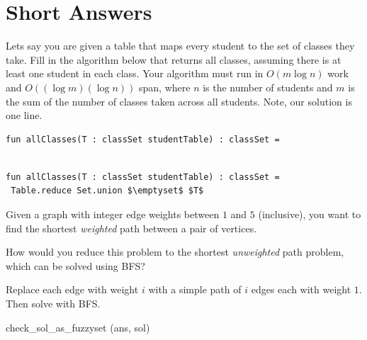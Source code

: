 \section{Short Answers}

%

\begin{problem}[20.][Classes]

Lets say you are given a table that maps every student to the set of
classes they take.  
Fill in the algorithm below that returns all classes,
assuming there is at least one student in each class.  Your algorithm
must run in $O(m \log n)$ work and $O((\log m)(\log n))$ span, where
$n$ is the number of students and $m$ is the sum of the number of
classes taken across all students.    Note, our solution is one line.

\ask

\begin{lstlisting}[numbers=none]
fun allClasses(T : classSet studentTable) : classSet = 


\end{lstlisting}


\sol
\begin{lstlisting}[numbers=none]
fun allClasses(T : classSet studentTable) : classSet = 
 Table.reduce Set.union $\emptyset$ $T$
\end{lstlisting}

\end{problem}

%

\begin{problem}

Given a graph with integer edge weights between $1$ and $5$
(inclusive), you want to find the shortest \emph{weighted} path
between a pair of vertices. 

\ask
How would you reduce this problem to the
shortest \emph{unweighted} path problem, which can be solved using
BFS?

\sol
Replace each edge with weight $i$ with a simple path of $i$ edges
each with weight $1$. Then solve with BFS.

\algo

\algog
check_sol_as_fuzzyset (ans, sol)

\end{problem}

